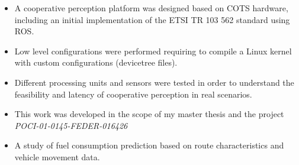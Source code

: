 \documentclass[10pt,a4paper,ragged2e]{altacv}
\begin{document}
\newpage

\begin{fullwidth}


\begin{itemize}
	\item A cooperative perception platform was designed based on COTS hardware, including an initial implementation of the ETSI TR 103 562 standard using ROS.
	\item Low level configurations were performed requiring to compile a Linux kernel with custom configurations (devicetree files).
	\item Different processing units and sensors were tested in order to understand the feasibility and latency of cooperative perception in real scenarios.
	\item This work was developed in the scope of my master thesis and the project \textit{POCI-01-0145-FEDER-016426}
\end{itemize}

\divider

\begin{itemize}
	\item A study of fuel consumption prediction based on route characteristics and vehicle movement data.
\end{itemize}

\end{fullwidth}








\end{document}
